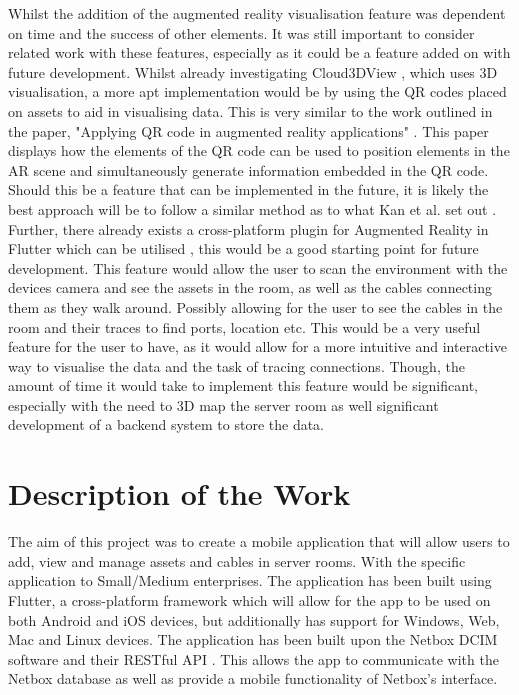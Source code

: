 \documentclass [11pt,a4paper]{article}
\begin{document}
Whilst the addition of the augmented reality visualisation feature was dependent on time and the success of other elements. It was still important to consider related work with these features, especially as it could be a feature added on with future development. Whilst already investigating Cloud3DView \cite{cloud3dview}, which uses 3D visualisation, a more apt implementation would be by using the QR codes placed on assets to aid in visualising data. This is very similar to the work outlined in the paper, "Applying QR code in augmented reality applications" \cite{applyingQR}. This paper displays how the elements of the QR code can be used to position elements in the AR scene and simultaneously generate information embedded in the QR code. Should this be a feature that can be implemented in the future, it is likely the best approach will be to follow a similar method as to what Kan et al. set out \cite{applyingQR}. Further, there already exists a cross-platform plugin for Augmented Reality in Flutter which can be utilised \cite{ar_flutter}, this would be a good starting point for future development. This feature would allow the user to scan the environment with the devices camera and see the assets in the room, as well as the cables connecting them as they walk around. Possibly allowing for the user to see the cables in the room and their traces to find ports, location etc. This would be a very useful feature for the user to have, as it would allow for a more intuitive and interactive way to visualise the data and the task of tracing connections. Though, the amount of time it would take to implement this feature would be significant, especially with the need to 3D map the server room as well significant development of a backend system to store the data.

\section{Description of the Work}
\label{sec:work}
The aim of this project was to create a mobile application that will allow users to add, view and manage assets and cables in server rooms. With the specific application to Small/Medium enterprises. The application has been built using Flutter, a cross-platform framework which will allow for the app to be used on both Android and iOS devices, but additionally has support for Windows, Web, Mac and Linux devices. The application has been built upon the Netbox DCIM software \cite{Netbox} and their RESTful API \cite{NetboxAPI}. This allows the app to communicate with the Netbox database as well as provide a mobile functionality of Netbox's interface.  
\end{document}
